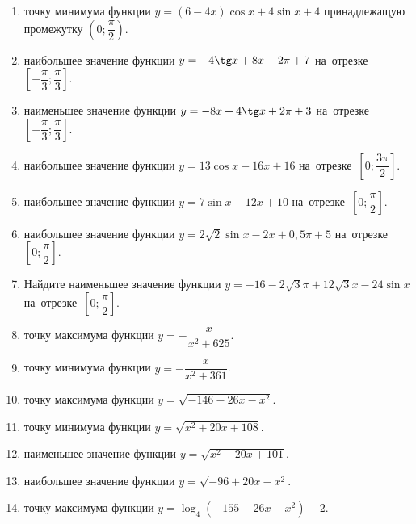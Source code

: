 \documentclass[a4paper,10pt]{article}
\begin{document}
\begin{enumerate}
\item {} точку минимума функции $y=\left(6-4x\right)\cos x +4\sin x+4$
принадлежащую промежутку $\left(0;\dfrac{\pi}{2}\right)$.







\item {} наибольшее значение функции $y=-4\tg x +8x-2\pi +7$ на~отрезке~$\left[-\dfrac{\pi}{3};\dfrac{\pi}{3}\right]$.

\item {} наименьшее значение функции $y=-8x +4\tg x+2\pi+3$ на~отрезке~$\left[-\dfrac{\pi}{3};\dfrac{\pi}{3}\right]$.

\item {} наибольшее значение функции $y=13\cos x-16x+16$ на~отрезке~$\left[0;\dfrac{3\pi}{2}\right]$.

\item {} наибольшее значение функции $y=7\sin x-12x+10$ на~отрезке~$\left[0;\dfrac{\pi}{2}\right]$.

\item {} наибольшее значение функции $y=2\sqrt{2}\sin x-2x+0,5\pi +5$ на~отрезке~$\left[0;\dfrac{\pi}{2}\right]$.

\item Найдите наименьшее значение функции $y=-16-2\sqrt{3}\pi+12\sqrt{3}x-24\sin x$ на~отрезке~$\left[0;\dfrac{\pi}{2}\right]$.

\item {} точку максимума функции $y=-\dfrac{x}{ x^2 +625}$.

\item {} точку минимума функции $y=-\dfrac{x}{ x^2 +361}$.

\item {} точку максимума функции $y=\sqrt{-146-26x-x^2}$.

\item {} точку минимума функции $y=\sqrt{x^2+20x+108}$.

\item {} наименьшее значение функции $y=\sqrt{x^2-20x+101}$.

\item {} наибольшее значение функции $y=\sqrt{-96+20x-x^2}$.

\item {} точку максимума функции $y=\log_4\left(-155-26x-x^2\right)-2$.


\end{enumerate}
\end{document}
